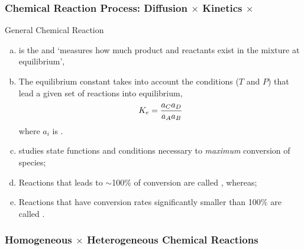 \documentclass[10pt,compress,unknownkeysallowed]{beamer}
\begin{document}
\begin{frame}
  \frametitle{Chemical Reaction Process: Diffusion $\times$ Kinetics $\times$ }

  \begin{block}{\begin{center}General Chemical Reaction\end{center}}
  \end{block}  
   \begin{enumerate}[a)]
       \item<1->  is the  and `measures how much product and reactants exist in the mixture at equilibrium',
       \item<1-> The equilibrium constant takes into account the conditions ($T$ and $P$) that lead a given set of reactions into equilibrium, \eg
             \begin{displaymath}
                  K_{e} = \displaystyle\frac{a_{C}a_{D}}{a_{A}a_{B}}
             \end{displaymath}
             where $a_{i}$ is . 
       \item<1->  studies state functions and conditions necessary to {\it maximum} conversion of species;
       \item<1-> Reactions that leads to $\sim$100$\%$ of conversion are called , whereas;
       \item<1-> Reactions that have conversion rates significantly smaller than 100$\%$ are called .
   \end{enumerate}
\end{frame}
\normalsize

\begin{frame}
  \frametitle{Homogeneous $\times$ Heterogeneous Chemical Reactions}

\end{frame}
\normalsize
\end{document}
